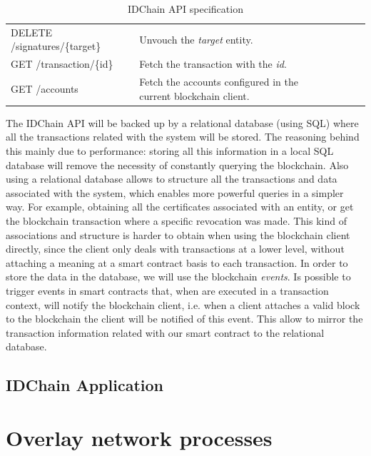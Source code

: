 {\begin{table}[]
\begin{tabular}{|l|l|lll}
    DELETE /signatures/\{target\}   & Unvouch the \textit{target} entity.                      &  &  &  \\ \cline{1-2}

    GET /transaction/\{id\}         & Fetch the transaction with the \textit{id}.                      &  &  &  \\ \cline{1-2}

    GET /accounts                   & Fetch the accounts configured in the current blockchain client.                        &  &  & \\ \cline{1-2}
  \end{tabular}%
  \caption{IDChain API specification}
\label{table:idchain-api-spec}
\end{table}

The IDChain API will be backed up by a relational database (using \ac{SQL}) where all the transactions related with the system will be stored.
The reasoning behind this mainly due to performance: storing all this information in a local \ac{SQL} database will remove the necessity of constantly querying the blockchain.
Also using a relational database allows to structure all the transactions and data associated with the system, which enables more powerful queries in a simpler way.
For example, obtaining all the certificates associated with an entity, or get the blockchain transaction where a specific revocation was made.
This kind of associations and structure is harder to obtain when using the blockchain client directly, since the client only deals with transactions at a lower level, without attaching a meaning at a smart contract basis to each transaction.
In order to store the data in the database, we will use the blockchain \textit{events}.
Is possible to trigger events in smart contracts that, when are executed in a transaction context, will notify the blockchain client, i.e. when a client attaches a valid block to the blockchain the client will be notified of this event.
This allow to mirror the transaction information related with our smart contract to the relational database.



\subsection{IDChain Application}
\label{subsection:idchain-app}

\section{Overlay network processes}

}
